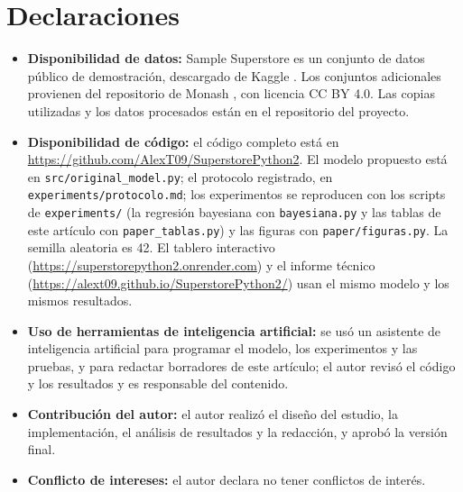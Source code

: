 \documentclass[pdflatex,sn-mathphys-num]{sn-jnl}
\theoremstyle{thmstyleone}
\begin{document}
\backmatter

\section*{Declaraciones}

\begin{itemize}
\item \textbf{Disponibilidad de datos:} Sample Superstore es un conjunto de datos público de demostración, descargado de Kaggle \cite{superstore}. Los conjuntos adicionales provienen del repositorio de Monash \cite{godahewa2021}, con licencia CC BY 4.0. Las copias utilizadas y los datos procesados están en el repositorio del proyecto.
\item \textbf{Disponibilidad de código:} el código completo está en \url{https://github.com/AlexT09/SuperstorePython2}. El modelo propuesto está en \texttt{src/original\_model.py}; el protocolo registrado, en \texttt{experiments/protocolo.md}; los experimentos se reproducen con los scripts de \texttt{experiments/} (la regresión bayesiana con \texttt{bayesiana.py} y las tablas de este artículo con \texttt{paper\_tablas.py}) y las figuras con \texttt{paper/figuras.py}. La semilla aleatoria es 42. El tablero interactivo (\url{https://superstorepython2.onrender.com}) y el informe técnico (\url{https://alext09.github.io/SuperstorePython2/}) usan el mismo modelo y los mismos resultados.
\item \textbf{Uso de herramientas de inteligencia artificial:} se usó un asistente de inteligencia artificial para programar el modelo, los experimentos y las pruebas, y para redactar borradores de este artículo; el autor revisó el código y los resultados y es responsable del contenido.
\item \textbf{Contribución del autor:} el autor realizó el diseño del estudio, la implementación, el análisis de resultados y la redacción, y aprobó la versión final.
\item \textbf{Conflicto de intereses:} el autor declara no tener conflictos de interés.
\end{itemize}


\end{document}
